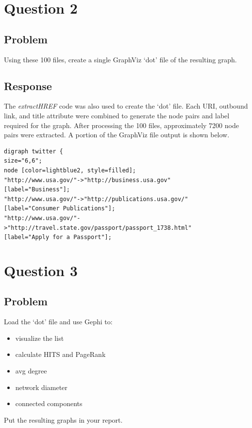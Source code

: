 \documentclass[letterpaper,11pt]{report}
\begin{document}
\begin{savenotes}
\section{Question 2}
\subsection{Problem}Using these 100 files, create a single GraphViz `dot' file of the resulting graph.
\subsection{Response}The \emph{extractHREF} code was also used to create the `dot' file. Each URI, outbound link, and title attribute were combined to generate the node pairs and label required for the graph. After processing the 100 files, approximately 7200 node pairs were extracted. A portion of the GraphViz file output is shown below.

\begin{verbatim}
digraph twitter { 
size="6,6"; 
node [color=lightblue2, style=filled];
"http://www.usa.gov/"->"http://business.usa.gov" 
[label="Business"];
"http://www.usa.gov/"->"http://publications.usa.gov/" 
[label="Consumer Publications"];
"http://www.usa.gov/"->"http://travel.state.gov/passport/passport_1738.html" 
[label="Apply for a Passport"];
\end{verbatim}

\section{Question 3}
\subsection{Problem}Load the `dot' file and use Gephi to:
\begin{itemize}
	\item visualize the list
	\item calculate HITS and PageRank
	\item avg degree
	\item network diameter
	\item connected components
\end{itemize}
Put the resulting graphs in your report.

\end{savenotes}
\end{document}
